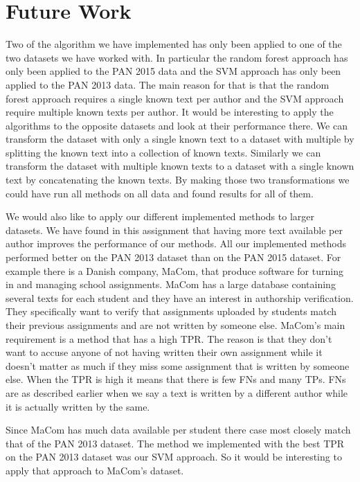 \section{Future Work} \label{sec:future_work}

Two of the algorithm we have implemented has only been applied to one of the
two datasets we have worked with. In particular the random forest approach has
only been applied to the PAN 2015 data and the \gls{SVM} approach has only been
applied to the PAN 2013 data. The main reason for that is that the random forest
approach requires a single known text per author and the \gls{SVM} approach
require multiple known texts per author. It would be interesting to apply the
algorithms to the opposite datasets and look at their performance there. We can
transform the dataset with only a single known text to a dataset with multiple
by splitting the known text into a collection of known texts. Similarly we can
transform the dataset with multiple known texts to a dataset with a single known
text by concatenating the known texts. By making those two transformations we
could have run all methods on all data and found results for all of them.

We would also like to apply our different implemented methods to larger
datasets. We have found in this assignment that having more text available per
author improves the performance of our methods. All our implemented methods
performed better on the PAN 2013 dataset than on the PAN 2015 dataset. For
example there is a Danish company, MaCom, that produce software for turning in
and managing school assignments. MaCom has a large database containing several
texts for each student and they have an interest in authorship verification.
They specifically want to verify that assignments uploaded by students match
their previous assignments and are not written by someone else. MaCom's main
requirement is a method that has a high \gls{TPR}. The reason is that they
don't want to accuse anyone of not having written their own assignment while it
doesn't matter as much if they miss some assignment that is written by someone
else. When the \gls{TPR} is high it means that there is few \gls{FN}s and many
\gls{TP}s. \gls{FN}s are as described earlier when we say a text is written by
a different author while it is actually written by the same.

Since MaCom has much data available per student there case most closely match
that of the PAN 2013 dataset. The method we implemented with the best \gls{TPR}
on the PAN 2013 dataset was our \gls{SVM} approach. So it would be interesting
to apply that approach to MaCom's dataset.
